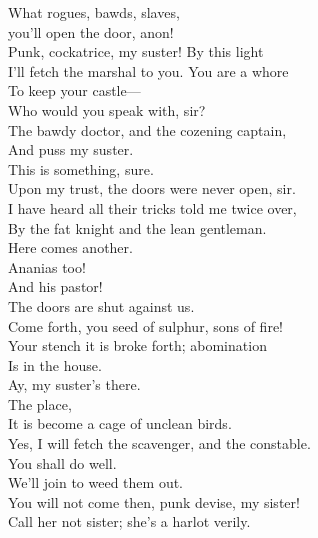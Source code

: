\documentclass[a4paper,oneside]{memoir}
\begin{document}
\begin{drama*}
\kastrilspeaks {} What rogues, bawds, slaves,\\
you'll open the door, anon!\\
Punk, cockatrice, my suster! By this light\\
I'll fetch the marshal to you. You are a whore\\
To keep your castle---\\
\facespeaks {} Who would you speak with, sir?\\
\kastrilspeaks The bawdy doctor, and the cozening captain,\\
And puss my suster.\\
\lovewitspeaks {} This is something, sure.\\
\facespeaks Upon my trust, the doors were never open, sir.\\
\kastrilspeaks I have heard all their tricks told me twice over,\\
By the fat knight and the lean gentleman.\\
\lovewitspeaks Here comes another.\\
\facespeaks {} Ananias too!\\
And his pastor!\\
\tribulationspeaks {} The doors are shut against us.\\
\ananiasspeaks {} Come forth, you seed of sulphur, sons of fire!\\
Your stench it is broke forth; abomination\\
Is in the house.\\
\kastrilspeaks {} Ay, my suster's there.\\
\ananiasspeaks {} The place,\\
It is become a cage of unclean birds.\\
\kastrilspeaks Yes, I will fetch the scavenger, and the constable.\\
\tribulationspeaks You shall do well.\\
\ananiasspeaks {} We'll join to weed them out.\\
\kastrilspeaks You will not come then, punk devise, my sister!\\
\ananiasspeaks Call her not sister; she's a harlot verily.\\

\end{drama*}
\end{document}
